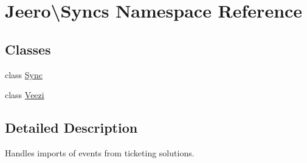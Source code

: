 \hypertarget{namespaceJeero_1_1Syncs}{}\section{Jeero\textbackslash{}Syncs Namespace Reference}
\label{namespaceJeero_1_1Syncs}
\subsection*{Classes}
\begin{DoxyCompactItemize}
\item 
class \hyperlink{classJeero_1_1Syncs_1_1Sync}{Sync}
\item 
class \hyperlink{classJeero_1_1Syncs_1_1Veezi}{Veezi}
\end{DoxyCompactItemize}


\subsection{Detailed Description}
Handles imports of events from ticketing solutions. 